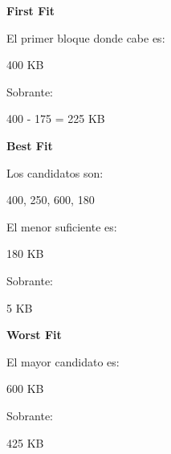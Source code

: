 \documentclass[
  spanish,
  letterpaper,
]{scrbook}
\newenvironment{Shaded}{\begin{snugshade}}{\end{snugshade}}
\newcommand{\NormalTok}[1]{\textcolor[rgb]{0.00,0.23,0.31}{#1}}
\begin{document}
\begin{tcolorbox}[enhanced jigsaw, arc=.35mm, bottomrule=.15mm, bottomtitle=1mm, breakable, colback=white, colbacktitle=quarto-callout-tip-color!10!white, colframe=quarto-callout-tip-color-frame, coltitle=black, left=2mm, leftrule=.75mm, opacityback=0, opacitybacktitle=0.6, rightrule=.15mm, title=\textcolor{quarto-callout-tip-color}{\faLightbulb}\hspace{0.5em}{✅ Solución}, titlerule=0mm, toprule=.15mm, toptitle=1mm]

\textbf{First Fit}

El primer bloque donde cabe es:

\begin{Shaded}
\begin{Highlighting}[]
\NormalTok{400 KB}
\end{Highlighting}
\end{Shaded}

Sobrante:

\begin{Shaded}
\begin{Highlighting}[]
\NormalTok{400 {-} 175 = 225 KB}
\end{Highlighting}
\end{Shaded}

\textbf{Best Fit}

Los candidatos son:

\begin{Shaded}
\begin{Highlighting}[]
\NormalTok{400, 250, 600, 180}
\end{Highlighting}
\end{Shaded}

El menor suficiente es:

\begin{Shaded}
\begin{Highlighting}[]
\NormalTok{180 KB}
\end{Highlighting}
\end{Shaded}

Sobrante:

\begin{Shaded}
\begin{Highlighting}[]
\NormalTok{5 KB}
\end{Highlighting}
\end{Shaded}

\textbf{Worst Fit}

El mayor candidato es:

\begin{Shaded}
\begin{Highlighting}[]
\NormalTok{600 KB}
\end{Highlighting}
\end{Shaded}

Sobrante:

\begin{Shaded}
\begin{Highlighting}[]
\NormalTok{425 KB}
\end{Highlighting}
\end{Shaded}

\end{tcolorbox}
\end{document}
